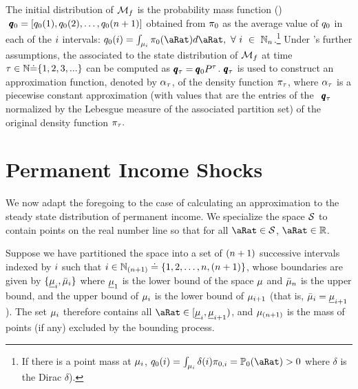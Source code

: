 \documentclass[../BufferStockTheory.tex]{subfiles}\usepackage{ApndxSteadyState}
\begin{document}
  The initial distribution of $\Mrkv_{f}$ is the probability mass function (\pmf) $~\vctr{\pDistDscr}_{0} = [\pDistDscr_{0}(1),\pDistDscr_{0}(2),\dots,\pDistDscr_{0}\StPls]$ obtained from $\pDens_{0}$ as the average value of $\pDistDscr_{0}$ in each of the $\this$ intervals: $\pDistDscr_{0}(\this)=\int_{\SetSub_{\this}} \pDens_{0}(\point)d\point ,~\forall~\this~\in~\Nteger_{\StNum}$.\footnote{If there is a point mass at $\SetSub_{\this}$, $\pDistDscr_{0}(\this)=\int_{\SetSub_\this}\delta(\this) \pDens_{0,\this}=\Pmeas_{0}(\point)>0$ where $\delta$ is the Dirac $\delta$).}   Under \cite{eaDiscretize}'s further assumptions, the {\pmf} associated to the state distribution of $\Mrkv_{f}$ at time $\tAbs \in \Nteger \dot{=} \{1,2,3,...\}$ can be computed as $\vctr{\pDistDscr}_{\tAbs}=\vctr{\pDistDscr}_{0}\PTrns^{\tAbs}$.  $\vctr{\pDistDscr}_{\tAbs}$ is used to construct an approximation function, denoted by $\pContAprx_{\tAbs}$, of the density function $\pDens_{\tAbs}$, where $\pContAprx_{\tAbs}$ is a piecewise constant approximation (with values that are the entries of the {\pmf}~$\vctr{\pDistDscr}_{\tAbs}$ normalized by the Lebesgue measure of the associated partition set) of the original density function $\pDens_{\tAbs}.$  %

    \section{Permanent Income Shocks}

  We now adapt the foregoing to the case of calculating an approximation to the steady state distribution of permanent income. We specialize the space $\DistSetSprtFull$ to contain points on the real number line so that for all $\point \in \DistSetSprtFull$, $\point \in \reals$.

  Suppose we have partitioned the space into a set of $\StPls$ successive intervals indexed by $\this$ such that $\this \in \Nteger_{\StPls} \doteq \{1,2,\dots,\StNum,\StPls\}$, whose boundaries are given by $\{\Bot{\SetSub}_{\this},\Top{\SetSub}_{\this}\}$ where $\Bot{\SetSub}_{1}$ is the lower bound of the space $\SetSub$ and $\Top{\SetSub}_{\StNum}$ is the upper bound, and the upper bound of $\SetSub_{\this}$ is the lower bound of $\SetSub_{\this+1}$ (that is, $\Top{\SetSub}_{\this}=\Bot{\SetSub}_{\this+1}$).  The set $\SetSub_{\this}$ therefore contains all  $\point \in [\Bot{\SetSub}_{\this},\Bot{\SetSub}_{\this+1})$, and $\SetSub_{\StPls}$ is the mass of points (if any) excluded by the bounding process.
  
\end{document}
